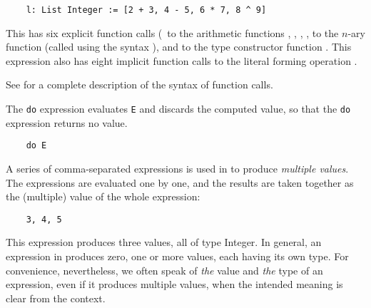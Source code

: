 \begin{small}
\begin{verbatim}
    l: List Integer := [2 + 3, 4 - 5, 6 * 7, 8 ^ 9]
\end{verbatim}
\end{small}

This has six explicit function calls (\ie{}~to the arithmetic functions
\ttin{+}, \ttin{-}, \ttin{*}, \quotedCaret, to the $n$-ary function 
(called using the syntax \ttin{[...]}), and to the type constructor function .
This expression also has eight implicit function calls to the literal
forming operation .

See  for a complete description
of the syntax of function calls.



The \verb"do" expression evaluates \verb"E" and discards the computed value,
so that the \verb"do" expression returns no value.

\begin{small}
\begin{verbatim}
    do E
\end{verbatim}
\end{small}


A series of comma-separated expressions is used in \asharp{} to produce
{\em multiple values\/}.  The expressions are evaluated one by one, and the
results are taken together as the (multiple) value of the whole expression:

\begin{small}
\begin{verbatim}
    3, 4, 5
\end{verbatim}
\end{small}
This expression produces three values, all of type Integer.
In general, an expression in \asharp{} produces zero, one or more
values, each having its own type.  For convenience,
nevertheless, we often speak of {\em the\/} value and {\em the\/} type
of an expression, even if it produces multiple values, when
the intended meaning is clear from the context.

